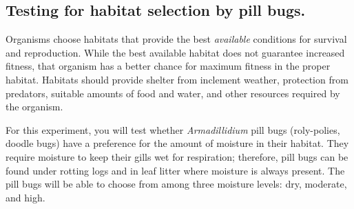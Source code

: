\documentclass[12pt, hidelinks]{exam}
\begin{document}
\subsection*{Testing for habitat selection by pill bugs.}

Organisms choose habitats that provide the best \emph{available} conditions for survival and reproduction.  While the best available habitat does not guarantee increased fitness, that organism has a better chance for maximum fitness in the proper habitat.  Habitats should provide shelter from inclement weather, protection from predators, suitable amounts of food and water, and other resources required by the organism. 

For this experiment, you will test whether \textit{Armadillidium} pill bugs (roly-polies, doodle bugs) have a preference for the amount of moisture in their habitat. They require moisture to keep their gills wet for respiration; therefore, pill bugs can be found under rotting logs and in leaf litter where moisture is always present. The pill bugs will be able to choose from among three moisture levels: dry, moderate, and high.
\end{document}
